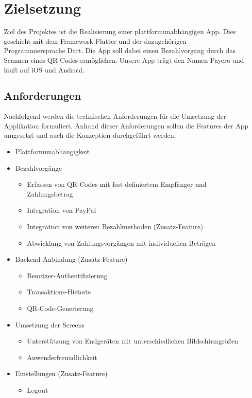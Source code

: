 
\chapter{Zielsetzung}

Ziel des Projektes ist die Realisierung einer plattformunabhängigen App.
Dies geschieht mit dem Framework Flutter und der dazugehörigen Programmiersprache Dart.
Die App soll dabei einen Bezahlvorgang durch das Scannen eines QR-Codes ermöglichen.
Unsere App trägt den Namen \glqq Payero\grqq{} und läuft auf iOS und Android.

\section{Anforderungen}

Nachfolgend werden die technischen Anforderungen für die Umsetzung der Applikation formuliert. Anhand dieser Anforderungen sollen die Features der App umgesetzt und auch die Konzeption durchgeführt werden:

\begin{itemize}
    \item Plattformunabhängigkeit
    \item Bezahlvorgänge
    \begin{itemize}
        \item Erfassen von QR-Codes mit fest definiertem Empfänger und Zahlungsbetrag
        \item Integration von PayPal
        \item Integration von weiteren Bezahlmethoden (Zusatz-Feature)
        \item Abwicklung von Zahlungsvorgängen mit individuellen Beträgen
    \end{itemize}
    \item Backend-Anbindung (Zusatz-Feature)
    \begin{itemize}
        \item Benutzer-Authentifizierung
        \item Transaktions-Historie
        \item QR-Code-Generierung
    \end{itemize}
    \item Umsetzung der Screens
    \begin{itemize}
            \item Unterstützung von Endgeräten mit unterschiedlichen Bildschirmgrößen
            \item Anwenderfreundlichkeit
    \end{itemize}
    \item Einstellungen (Zusatz-Feature)
    \begin{itemize}
        \item Logout
    \end{itemize}
\end{itemize}

